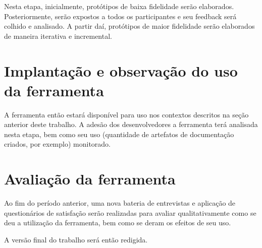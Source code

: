 Nesta etapa, inicialmente, protótipos de baixa fidelidade serão elaborados. Posteriormente, serão expostos a todos os participantes e seu feedback será colhido e analisado. A partir daí, protótipos de maior fidelidade serão elaborados de maneira iterativa e incremental.

\section {Implantação e observação do uso da ferramenta}

A ferramenta então estará disponível para uso nos contextos descritos na seção anterior deste trabalho. A adesão dos desenvolvedores a ferramenta terá analisada nesta etapa, bem como seu uso (quantidade de artefatos de documentação criados, por exemplo) monitorado.



\section {Avaliação da ferramenta}

Ao fim do período anterior, uma nova bateria de entrevistas e aplicação de questionários de satisfação serão realizadas para avaliar qualitativamente como se deu a utilização da ferramenta, bem como se deram os efeitos de seu uso. 


A versão final do trabalho será então redigida.
